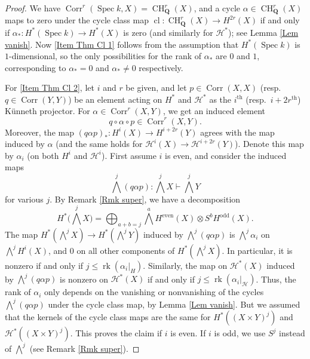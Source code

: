 \documentclass[11pt]{amsart}
\theoremstyle{definition}
\renewcommand{\H}{\mathcal H}
\newcommand{\Q}{\mathbf Q}
\newcommand{\Spec}{\operatorname{Spec}}
\newcommand{\CH}{\operatorname{CH}}
\newcommand{\cl}{\operatorname{cl}}
\newcommand{\even}{^{\operatorname{even}}}
\newcommand{\odd}{^{\operatorname{odd}}}
\newcommand{\Corr}{\operatorname{Corr}}
\newcommand{\rk}{\operatorname{rk}}
\newcommand{\cto}{\vdash}
\begin{document}
\begin{proof}
We have $\Corr^r(\Spec k,X) = \CH^r_\Q(X)$, and a cycle $\alpha \in
\CH^r_\Q(X)$ maps to zero under the cycle class map $\cl \colon \CH^r_\Q(X) \to
H^{2r}(X)$ if and only if $\alpha_* \colon H^*(\Spec k) \to H^*(X)$
is zero (and similarly for $\H^*$); see Lemma \ref{Lem vanish}. Now
\ref{Item Thm Cl 1} follows from the assumption that $H^*(\Spec k)$
is $1$-dimensional, so the only possibilities for the rank of
$\alpha_*$ are $0$ and $1$, corresponding to $\alpha_* = 0$ and
$\alpha_* \neq 0$ respectively.

For \ref{Item Thm Cl 2}, let $i$ and $r$ be given, and let $p \in
\Corr(X,X)$ (resp.~$q \in \Corr(Y,Y)$) be an element acting on $H^*$
and $\H^*$ as the $i^{\text{th}}$ (resp.~$i+2r^{\text{th}}$)
K\"unneth projector. For $\alpha \in \Corr^r(X,Y)$, we get an
induced element \vspace{-.2em}
\[
q\circ\alpha\circ p \in \Corr^r(X,Y).
\]
Moreover, the map $(q\alpha p)_* \colon H^i(X) \to H^{i+2r}(Y)$
agrees with the map induced by $\alpha$ (and the same holds for
$\H^i(X) \to \H^{i+2r}(Y)$). Denote this map by $\alpha_i$ (on both
$H^i$ and $\H^i$). First assume $i$ is even, and consider the
induced maps
\[
{\textstyle\bigwedge\nolimits}^j (q\alpha p) \colon
{\textstyle\bigwedge\nolimits}^j X \cto
\textstyle{\bigwedge\nolimits}^j Y
\]
for various $j$. %
%
By Remark \ref{Rmk super}, we have a decomposition
\[
H^*\Big({\textstyle\bigwedge}^j X\Big) =
\bigoplus_{a+b=j}{\textstyle\bigwedge}^a H\even(X) \otimes S^b
H\odd(X).
\]
The map $H^*(\bigwedge^j X) \to H^*(\bigwedge^j Y)$ induced by
$\bigwedge^j(q\alpha p)$ is $\bigwedge^j\alpha_i$ on $\bigwedge^j
H^i(X)$, and $0$ on all other components of $H^*(\bigwedge^j X)$. In
particular, it is nonzero if and only if $j \leq \rk(\alpha_i|_H)$.
Similarly, the map on $\H^*(X)$ induced by $\bigwedge^j(q\alpha p)$
is nonzero on $\H^*(X)$ if and only if $j \leq \rk(\alpha_i|_\H)$.
Thus, the rank of $\alpha_i$ only depends on the vanishing or
nonvanishing of the cycles $\bigwedge^j(q\alpha p)$ under the cycle
class map, by Lemma \ref{Lem vanish}. But we assumed that the
kernels of the cycle class maps are the same for $H^*((X\times
Y)^j)$ and $\H^*((X \times Y)^j)$. This proves the claim if $i$ is
even. If $i$ is odd, we use $S^j$ instead of $\bigwedge^j$ (see
Remark \ref{Rmk super}).
\end{proof}
\end{document}
